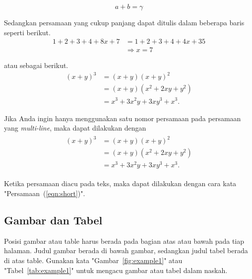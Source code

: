         \begin{equation}
            \label{eqn:short}
            a+b=\gamma
        \end{equation}
        
        \noindent Sedangkan persamaan yang cukup panjang dapat ditulis dalam beberapa baris seperti berikut.
        \begin{equation}
            \label{eqn:long1}
            \begin{split}
                1+2+3+4+8x+7 & =1+2+3+4+4x+35 \\
                & \Rightarrow x=7
            \end{split}
        \end{equation}
        
        \noindent atau sebagai berikut.
        \begin{align}
            \label{eqn:long2}
            (x+y)^3&=(x+y)(x+y)^2\\
                   &=(x+y)(x^2+2xy+y^2)\\
                   &=x^3+3x^2y+3xy^3+x^3.
        \end{align}
        
        Jika Anda ingin hanya menggunakan satu nomor persamaan pada persamaan yang \textit{multi-line}, maka dapat dilakukan dengan
        \begin{align}
            \label{eqn:long3}
            \begin{split}
                 (x+y)^3&=(x+y)(x+y)^2\\
                       &=(x+y)(x^2+2xy+y^2)\\
                       &=x^3+3x^2y+3xy^3+x^3.
            \end{split}
        \end{align}
        
        \noindent Ketika persamaan diacu pada teks, maka dapat dilakukan dengan cara  kata "Persamaan~(\ref{eqn:short})".
    
    \subsection{Gambar dan Tabel}
    \label{subsec:gmbr_tab}
        
        Posisi gambar atau table harus berada pada bagian atas atau bawah pada tiap halaman. Judul gambar berada di bawah gambar, sedangkan judul tabel berada di atas table. Gunakan kata "Gambar~\ref{fig:example1}" atau "Tabel~\ref{tab:example1}" untuk mengacu gambar atau tabel dalam naskah.
        

